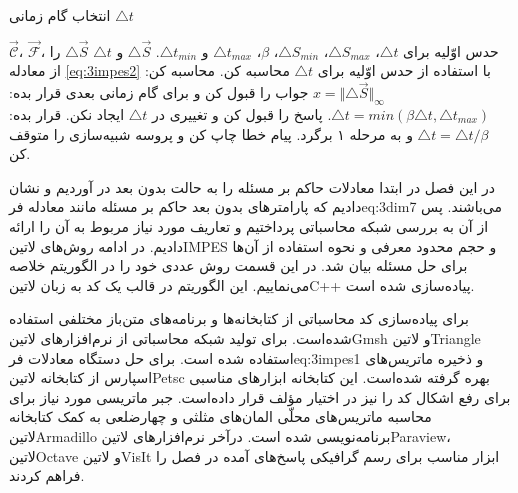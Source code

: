 \begin{algorithm}      
	\small
\caption{انتخاب گام زمانی $\triangle t$}  
\label{alg:alg1}                 
\begin{algorithmic}[1]	
	\REQUIRE $\vec{\mathcal C}$، $\vec{\mathcal F}$، حدس اوّلیه برای $\triangle t$، 
		$\triangle S_{max}$، $\triangle S_{min}$، $\beta$، $\triangle t_{max}$ و $\triangle t_{min}$.       			
	\ENSURE $\triangle \vec{S}$ و $ \triangle t$
	\STATE $\triangle \vec S$ را از معادله \eqref{eq:3impes2} با استفاده از حدس اوّلیه برای  $\triangle t$  محاسبه کن.
	\STATE محاسبه کن: $x= \Vert \triangle \vec S \Vert_\infty$
		\STATE جواب را قبول کن و برای گام زمانی بعدی قرار بده: $\triangle t = min(\beta \triangle t, \triangle t_{max})$. 
		\STATE پاسخ را قبول کن و تغییری در  $\triangle t$ ایجاد نکن.
		\STATE قرار بده: $\triangle t = \triangle t / \beta$ و به مرحله ۱ برگرد.
	\ELSE
		\STATE پیام خطا چاپ کن و پروسه شبیه‌سازی را متوقف کن. 
	\ENDIF
\end{algorithmic}      
\end{algorithm}

در این فصل در ابتدا معادلات حاکم بر مسئله را به حالت بدون بعد در آوردیم و نشان دادیم که پارامتر‌های بدون بعد حاکم بر مسئله مانند معادله ‌فر{eq:3dim7} می‌باشند. پس از آن به بررسی شبکه محاسباتی پرداختیم و تعاریف مورد نیاز مربوط به آن را ارائه دادیم. در ادامه روش‌های ‌لاتین{IMPES} و حجم محدود معرفی و نحوه استفاده از آن‌ها برای حل مسئله بیان شد. در این قسمت روش عددی خود را در الگوریتم  خلاصه می‌نماییم. این الگوریتم در قالب یک کد به زبان ‌لاتین{C++} پیاده‌سازی شده است. 

برای پیاده‌سازی کد محاسباتی از کتابخا‌نه‌ها و برنامه‌های متن‌باز مختلفی استفاده شده‌است. برای تولید شبکه محاسباتی از نرم‌افزار‌های ‌لاتین{Gmsh} و ‌لاتین{Triangle} استفاده شده است. برای حل دستگاه معادلات ‌فر{eq:3impes1} و ذخیره ماتریس‌های اسپارس از کتابخانه ‌لاتین{Petsc} بهره گرفته‌ شده‌است. این کتابخانه ابزارهای مناسبی برای رفع اشکال کد را نیز در اختیار مؤلف قرار داده‌است. جبر ماتریسی مورد نیاز برای محاسبه ماتریس‌های محلّی المان‌های مثلثی و چهار‌ضلعی به کمک کتابخانه ‌لاتین{Armadillo} برنامه‌نویسی شده است. درآخر نرم‌افزارهای ‌لاتین{Paraview}، ‌لاتین{Octave} و ‌لاتین{VisIt} ابزار مناسب برای رسم گرافیکی پاسخ‌های آمده در فصل  را فراهم کردند.

